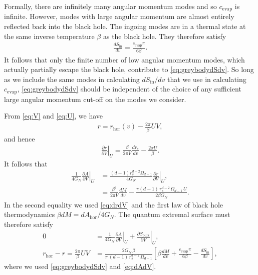 \documentclass[11pt,a4paper]{article}
\begin{document}
Formally, there are infinitely many angular momentum modes and so $c_\text{evap}$ is infinite. However, modes with large angular momentum are almost entirely reflected back into the black hole. The ingoing modes are in a thermal state at the same inverse temperature $\beta$ as the black hole. They therefore satisfy \cite{calabrese2004entanglement, calabrese2009entanglement}
\begin{align}
\frac{d S_\text{in}}{d v} = \frac{c_\text{evap} \pi}{6 \beta}.
\end{align}
It follows that only the finite number of low angular momentum modes, which actually partially escape the black hole, contribute to \eqref{eq:greybodydSdv}. So long as we include the same modes in calculating $dS_{\text{in}}/dv$ that we use in calculating $c_\text{evap}$, \eqref{eq:greybodydSdv} should be independent of the choice of any sufficient large angular momentum cut-off on the modes we consider.

From \eqref{eq:V} and \eqref{eq:U}, we have
\begin{align} \label{eq:rUV}
r = r_\text{hor}(v) - \frac{2 \pi}{\beta} UV,
\end{align}
and hence
\begin{align} \label{eq:drdV}
\left. \frac{\partial r}{\partial V} \right|_U = \frac{\beta}{2 \pi V} \frac{d r_s}{d v} - \frac{2 \pi U}{\beta}.
\end{align}
It follows that
\begin{align}
\frac{1}{4 G_N} \left. \frac{\partial A}{\partial V} \right|_U &= \frac{(d-1) r_s^{d-2} \Omega_{d-1}}{4 G_N} \left. \frac{\partial r}{\partial V} \right|_U,
\\ & = \frac{\beta^2}{2 \pi V} \frac{d M}{d v} - \frac{\pi (d-1)\, r_s^{d-2} \,\Omega_{d-1}\, U}{2 \beta G_N}. \label{eq:dAdV}
\end{align}
In the second equality we used \eqref{eq:drdV} and the first law of black hole thermodynamics $\beta dM = dA_\text{hor}/4G_N$. The quantum extremal surface must therefore satisfy
\begin{align}
0 &= \frac{1}{4 G_N} \left. \frac{\partial A}{\partial V} \right|_U + \left.\frac{\partial S_\text{bulk}}{\partial V}\right|_U,
\\  r_{\text{hor}} - r = \frac{2 \pi}{\beta} U V &=  \frac{2 G_N\,\beta}{\pi\,(d-1)\, r_s^{d-2} \,\Omega_{d-1}}\left[\beta \frac{d M}{d v} + \frac{c_\text{evap} \pi}{6 \beta} - \frac{d S_\text{in}}{d v}\right], \label{eq:marginalgreybody}
\end{align}
where we used \eqref{eq:greybodydSdv} and \eqref{eq:dAdV}.
\end{document}
